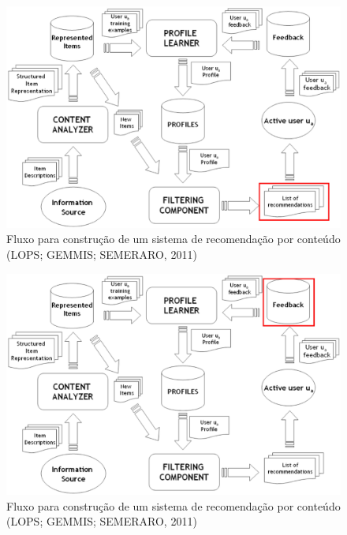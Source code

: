 \begin{frame}

\begin{figure}[h!]
  \centering
    \includegraphics[width=1\textwidth]{figura/recomendacao_conteudo_5.eps}
  \caption{Fluxo para construção de um sistema de recomendação por conteúdo (LOPS; GEMMIS; SEMERARO, 2011)}
\end{figure}

\end{frame}

\begin{frame}

\begin{figure}[h!]
  \centering
    \includegraphics[width=1\textwidth]{figura/recomendacao_conteudo_6.eps}
  \caption{Fluxo para construção de um sistema de recomendação por conteúdo (LOPS; GEMMIS; SEMERARO, 2011)}
\end{figure}

\end{frame}


